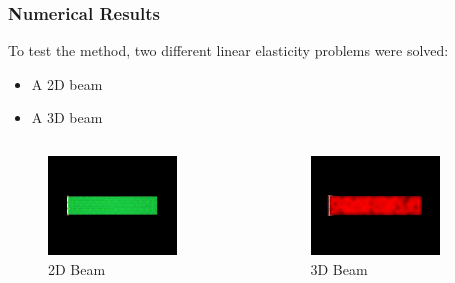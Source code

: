 \documentclass{beamer}
\begin{document}
            

\begin{frame}
    \frametitle{Numerical Results}
    To test the method, two different linear elasticity problems were solved:
    \begin{itemize}
        \item A 2D beam
        \item A 3D beam
    \end{itemize}
    \begin{columns}
        \begin{figure}
            \centering
            \includegraphics[width=0.8\textwidth]{Images/2D_beam.png}
            \caption{2D Beam}
        \end{figure}
        \begin{figure}
            \centering
            \includegraphics[width=0.8\textwidth]{Images/3D_beam.png}
            \caption{3D Beam}
        \end{figure}
    \end{columns}
\end{frame}
\end{document}
